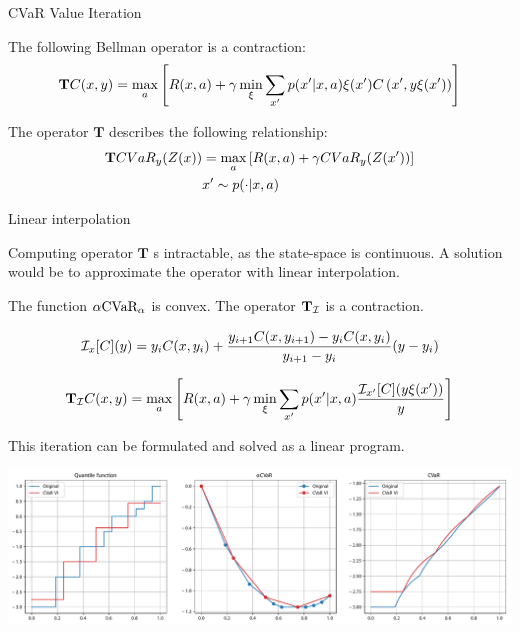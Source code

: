 \documentclass{beamer}
\begin{document}
\begin{frame}{CVaR Value Iteration}

\begin{theorem}
The following Bellman operator is a contraction:
$$\mathbf{T}C(x, y) = \max_a \left[ { R(x, a) + \gamma \min_{\xi} \sum_{x'} p(x'| x, a)\xi(x') C\left( {x', y\xi(x')} \right)} \right]$$
\end{theorem}

\vspace{1cm}

The operator $\mathbf{T}$ describes the following relationship:
\begin{equation*}
\begin{split}
\mathbf{T} CVaR_y(Z(x))&=\max_a \left[ {R(x, a) + \gamma CVaR_{y}(Z(x'))} \right]\\
&x' \sim p(\cdot|x, a)
\end{split}
\end{equation*}

\end{frame}


\begin{frame}{Linear interpolation}

Computing operator $\mathbf{T}$ s intractable, as the state-space is continuous. A solution would be to approximate the operator with linear interpolation.

\begin{theorem}
The function $\alpha\text{CVaR}_\alpha$ is convex. The operator $\mathbf{T}_{\mathcal{I}}$ is a contraction.

$$\mathcal{I}_{x}[C](y)=y_iC(x,y_{i})+\frac{y_{i+1}C(x,y_{i+1})-y_iC(x,y_{i})}{y_{i+1}-y_i}(y-y_i)$$

$$\mathbf{T}_{\mathcal{I}} C(x, y) = \max_a \left[ { R(x, a) + \gamma \min_{\xi} \sum_{x'} p(x'| x, a)\dfrac{\mathcal{I}_{x'} [C](y\xi(x'))}{y}} \right]$$

\end{theorem}

This iteration can be formulated and solved as a linear program.

\end{frame}


\begin{frame}
\center
\includegraphics[width=\linewidth]{../gfx/cvar_visualized_old.pdf}

\end{frame}
\end{document}
